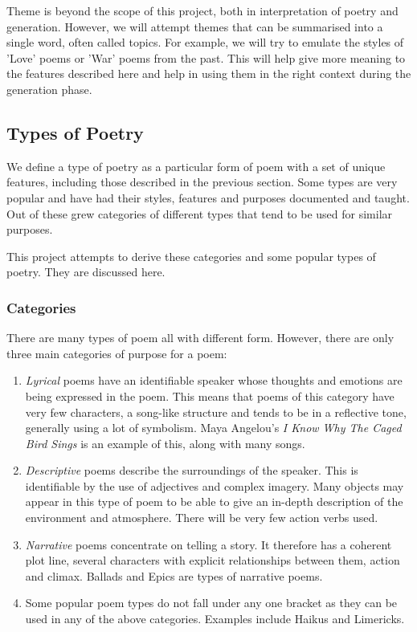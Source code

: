 Theme is beyond the scope of this project, both in interpretation of poetry and generation. However, we will attempt themes that can be summarised into a single word, often called topics. For example, we will try to emulate the styles of 'Love' poems or 'War' poems from the past. This will help give more meaning to the features described here and help in using them in the right context during the generation phase.

\subsection{Types of Poetry}

We define a type of poetry as a particular form of poem with a set of unique features, including those described in the previous section. Some types are very popular and have had their styles, features and purposes documented and taught. Out of these grew categories of different types that tend to be used for similar purposes.

This project attempts to derive these categories and some popular types of poetry. They are discussed here.

\subsubsection{Categories}

There are many types of poem all with different form. However, there are only three main categories of purpose for a poem:

\begin{enumerate}
\item{\textit{Lyrical} poems have an identifiable speaker whose thoughts and emotions are being expressed in the poem. This means that poems of this category have very few characters, a song-like structure and tends to be in a reflective tone, generally using a lot of symbolism. Maya Angelou's \textit{I Know Why The Caged Bird Sings} is an example of this, along with many songs.}
\item{\textit{Descriptive} poems describe the surroundings of the speaker. This is identifiable by the use of adjectives and complex imagery. Many objects may appear in this type of poem to be able to give an in-depth description of the environment and atmosphere. There will be very few action verbs used.}
\item{\textit{Narrative} poems concentrate on telling a story. It therefore has a coherent plot line, several characters with explicit relationships between them, action and climax. Ballads and Epics are types of narrative poems.}
\item{Some popular poem types do not fall under any one bracket as they can be used in any of the above categories. Examples include Haikus and Limericks.}
\end{enumerate}

